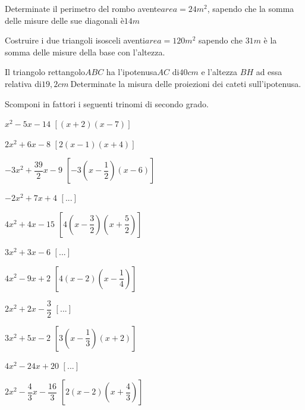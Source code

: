 \begin{esercizio}
 \label{ese:3.81}
Determinate il perimetro del rombo avente$area = 24\unit{m^{2}}$, sapendo 
che 
la somma delle misure delle sue diagonali è$14\unit{m}$
\end{esercizio}

\begin{esercizio}
\label{ese:3.82}
Costruire i due triangoli isosceli aventi$area = 120\unit{m^{2}}$ sapendo 
che 
$31\unit{m}$ è la somma delle misure della base con l'altezza.
\end{esercizio}

\begin{esercizio}
 \label{ese:3.83}
Il triangolo rettangolo$ABC$ ha l'ipotenusa$AC$ di$40\unit{cm}$ e l'altezza 
$BH$ ad essa relativa di$19,2\unit{cm}~$Determinate la misura delle 
proiezioni 
dei cateti sull'ipotenusa.
\end{esercizio}


\begin{esercizio}[\Ast]
 \label{ese:3.84}
Scomponi in fattori i seguenti trinomi di secondo grado.
\begin{multicols}{2}
\begin{enumeratea}
\item$x^{2}-5 x-14$ \hfill$\left[(x + 2) (x-7)\right]$
\item$2 x^{2} + 6 x-8$ \hfill$\left[2 (x-1) (x + 4)\right]$
\item$- 3 x^{2} + \dfrac{39}{2} x-9$ 
 \hfill$\left[-3 \left(x-\dfrac{1}{2} \right) (x-6)\right]$
\item$- 2 x^{2} + 7 x + 4$ \hfill$\left[...\right]$
\item$4 x^{2} + 4 x-15$ 
 \hfill$\left[4 \left(x-\dfrac{3}{2} \right) 
         \left(x + \dfrac{5}{2} \right)\right]$
\item$3 x^{2} + 3 x-6$ \hfill$\left[...\right]$
\item$4 x^{2}-9 x + 2$ 
 \hfill$\left[4 (x-2) \left(x-\dfrac{1}{4} \right)\right]$
\item$2 x^{2} + 2 x - \dfrac{3}{2}$ \hfill$\left[...\right]$
\item$3 x^{2} + 5 x - 2$ 
 \hfill$\left[3 \left(x-\dfrac{1}{3} \right) (x + 2)\right]$
\item$4 x^{2}-24 x + 20$ 
 \hfill$\left[...\right]$
\item$2 x^{2}-\dfrac{4}{3} x - \dfrac{16}{3}$ 
 \hfill$\left[2 (x-2) \left(x + \dfrac{4}{3} \right)\right]$
\end{enumeratea}
\end{multicols}
\end{esercizio}

